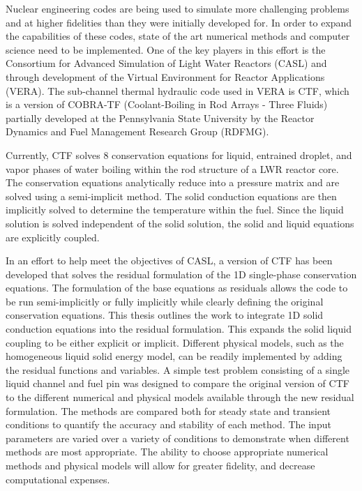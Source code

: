 Nuclear engineering codes  are being used to simulate more challenging problems
and at higher fidelities  than they were initially developed for. In order to
expand the capabilities of  these codes, state of the art numerical methods and
computer science need to be  implemented. One of the key players in this effort
is the Consortium for Advanced  Simulation of Light Water Reactors (CASL) and
through development of the  Virtual Environment for Reactor Applications (VERA).
The sub-channel thermal  hydraulic code used in VERA is CTF, which is a version
of COBRA-TF (Coolant-Boiling in Rod Arrays - Three  Fluids) partially developed
at the Pennsylvania State University by the Reactor Dynamics and Fuel Management
Research Group (RDFMG).

Currently, CTF solves 8 conservation equations for liquid, entrained
droplet, and vapor phases of  water boiling within the rod structure of a LWR
reactor core. The conservation  equations analytically reduce into a pressure
matrix and are solved using a  semi-implicit method. The solid conduction
equations are then implicitly  solved to determine the temperature within the
fuel. Since the liquid solution  is solved independent of the solid solution,
the solid and liquid equations are explicitly coupled.

In an effort to help meet the objectives of CASL,  a version of CTF has
been developed that solves the residual formulation  of the 1D single-phase
conservation equations. The formulation of the base  equations as residuals
allows the code to be run semi-implicitly or fully  implicitly while clearly
defining the original conservation equations. This thesis outlines the work to
integrate 1D solid conduction equations into the  residual formulation. This
expands the solid liquid coupling to be either  explicit or implicit. Different
physical models, such as the homogeneous liquid  solid energy model, can be
readily implemented by adding the residual  functions and variables. A simple
test problem consisting of a single liquid  channel and fuel pin was designed to
compare the original version of CTF to  the different numerical and
physical models available through the new  residual formulation. The methods are
compared both for steady state and transient  conditions to quantify the
accuracy and stability of each method. The input  parameters are varied over a
variety of conditions to demonstrate when different  methods are most
appropriate. The ability to choose appropriate numerical  methods and physical
models will allow for greater fidelity, and decrease computational expenses.
